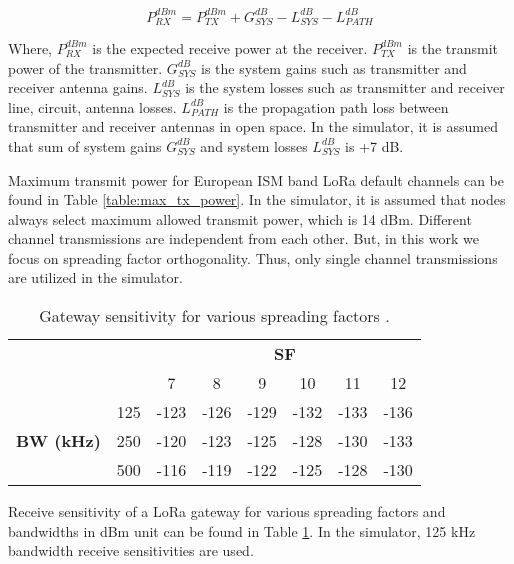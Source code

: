 \begin{equation} \label{eq:expected_rx_power}
P^{dBm}_{RX} = P^{dBm}_{TX} + G^{dB}_{SYS} - L^{dB}_{SYS} - L^{dB}_{PATH}
\end{equation}

Where, $P^{dBm}_{RX}$ is the expected receive power at the receiver. $P^{dBm}_{TX}$ is the transmit power of the transmitter. $G^{dB}_{SYS}$ is the system gains such as transmitter and receiver antenna gains. $L^{dB}_{SYS}$ is the system losses such as transmitter and receiver line, circuit, antenna losses. $L^{dB}_{PATH}$ is the propagation path loss between transmitter and receiver antennas in open space. In the simulator, it is assumed that sum of system gains $G^{dB}_{SYS}$ and system losses $L^{dB}_{SYS}$ is +7 dB.

Maximum transmit power for European ISM band LoRa default channels can be found in Table \ref{table:max_tx_power}. In the simulator, it is assumed that nodes always select maximum allowed transmit power, which is 14 dBm. Different channel transmissions are independent from each other. But, in this work we focus on spreading factor orthogonality. Thus, only single channel transmissions are utilized in the simulator.

\begin{table}
\centering
\caption{Gateway sensitivity for various spreading factors \cite{SX1276}.}
\label{table:gw_sf_sensitivity}
\begin{tabular}{|c|c|c|c|c|c|c|c|}
\hline
\multicolumn{2}{|c|}{\multirow{2}{*}{}} & \multicolumn{6}{c|}{\textbf{SF}} \\ \cline{3-8}
\multicolumn{2}{|c|}{}                  &    7 &    8 &    9 &   10 &   11 &   12 \\ \hline
\multirow{3}{*}{\textbf{BW (kHz)}}  & 125 & -123 & -126 & -129 & -132 & -133 & -136 \\ \cline{2-8}
                                    & 250 & -120 & -123 & -125 & -128 & -130 & -133 \\ \cline{2-8}
                                    & 500 & -116 & -119 & -122 & -125 & -128 & -130 \\ \hline
\end{tabular}
\end{table}

Receive sensitivity of a LoRa gateway for various spreading factors and bandwidths in dBm unit can be found in Table \ref{table:gw_sf_sensitivity}. In the simulator, 125 kHz bandwidth receive sensitivities are used.

